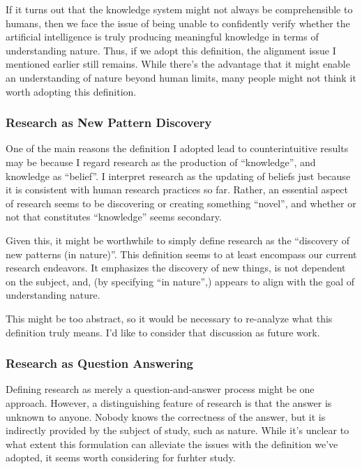 If it turns out that the knowledge system might not always be comprehensible to humans, then we face the issue of being unable to confidently verify whether the artificial intelligence is truly producing meaningful knowledge in terms of understanding nature. Thus, if we adopt this definition, the alignment issue I mentioned earlier still remains. While there's the advantage that it might enable an understanding of nature beyond human limits, many people might not think it worth adopting this definition.
 
\subsubsection{Research as New Pattern Discovery}
One of the main reasons the definition I adopted lead to counterintuitive results may be because I regard research as the production of ``knowledge'', and knowledge as ``belief''. I interpret research as the updating of beliefs just because it is consistent with human research practices so far. Rather, an essential aspect of research seems to be discovering or creating something ``novel'', and whether or not that constitutes ``knowledge'' seems secondary.

Given this, it might be worthwhile to simply define research as the ``discovery of new patterns (in nature)''. This definition seems to at least encompass our current research endeavors. It emphasizes the discovery of new things, is not dependent on the subject, and, (by specifying ``in nature'',) appears to align with the goal of understanding nature.

This might be too abstract, so it would be necessary to re-analyze what this definition truly means. I'd like to consider that discussion as future work.

\subsubsection{Research as Question Answering}
Defining research as merely a question-and-answer process might be one approach. However, a distinguishing feature of research is that the answer is unknown to anyone. Nobody knows the correctness of the answer, but it is indirectly provided by the subject of study, such as nature. While it's unclear to what extent this formulation can alleviate the issues with the definition we've adopted, it seems worth considering for furhter study.

